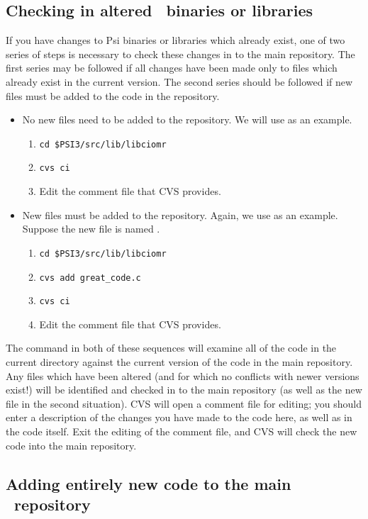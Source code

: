 \subsection{Checking in altered \PSIthree\ binaries or libraries}

If you have changes to Psi binaries or libraries which already exist, one
of two series of steps is necessary to check these changes in to the main
repository. The first series may be followed if all changes have been made
only to files which already exist in the current version. The second series
should be followed if new files must be added to the code in the repository.

\begin{itemize}
\item No new files need to be added to the repository. We will use
 as an example. 
\begin{enumerate}
\item {\tt cd \$PSI3/src/lib/libciomr}
\item {\tt cvs ci}
\item Edit the comment file that CVS provides. 
\end{enumerate}
\item New files must be added to the repository. Again, we use 
as an example. Suppose the new file is named  .
\begin{enumerate}
\item {\tt cd \$PSI3/src/lib/libciomr} 
\item {\tt cvs add great\_code.c} 
\item {\tt cvs ci}
\item Edit the comment file that CVS provides.
\end{enumerate}
\end{itemize}

The  command in both of these sequences will examine all of
the code in the current  directory against the current
version of the code in the main repository. Any files which have been
altered (and for which no conflicts with newer versions exist!) will be
identified and checked in to the main repository (as well as the new file
in the second situation).  CVS will open a comment file for editing; you
should enter a description of the changes you have made to the code here,
as well as in the code itself.  Exit the editing of the comment file,
and CVS will check the new code into the main repository.

\subsection{Adding entirely new code to the main \PSIthree\ repository} 
\label{checkin_new}

